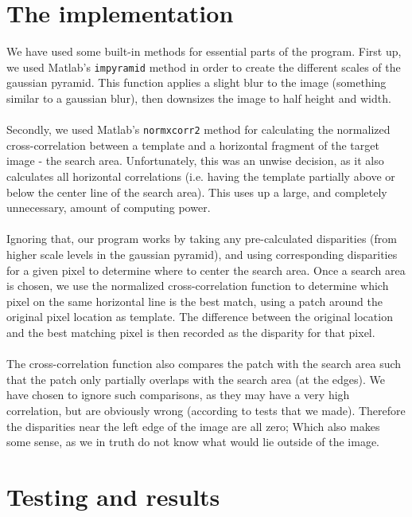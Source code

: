 \documentclass[12pt,a4paper,oneside,final]{article}
\begin{document}
\section{The implementation}
We have used some built-in methods for essential parts of the program. First up, we used Matlab's \texttt{impyramid} method in order to create the different scales of the gaussian pyramid. This function applies a slight blur to the image (something similar to a gaussian blur), then downsizes the image to half height and width.\\\\
Secondly, we used Matlab's \texttt{normxcorr2} method for calculating the normalized cross-correlation between a template and a horizontal fragment of the target image - the search area. Unfortunately, this was an unwise decision, as it also calculates all horizontal correlations (i.e. having the template partially above or below the center line of the search area). This uses up a large, and completely unnecessary, amount of computing power.\\\\
Ignoring that, our program works by taking any pre-calculated disparities (from higher scale levels in the gaussian pyramid), and using corresponding disparities for a given pixel to determine where to center the search area. Once a search area is chosen, we use the normalized cross-correlation function to determine which pixel on the same horizontal line is the best match, using a patch around the original pixel location as template. The difference between the original location and the best matching pixel is then recorded as the disparity for that pixel.\\\\
The cross-correlation function also compares the patch with the search area such that the patch only partially overlaps with the search area (at the edges). We have chosen to ignore such comparisons, as they may have a very high correlation, but are obviously wrong (according to tests that we made). Therefore the disparities near the left edge of the image are all zero; Which also makes some sense, as we in truth do not know what would lie outside of the image.

\section{Testing and results}
\end{document}
